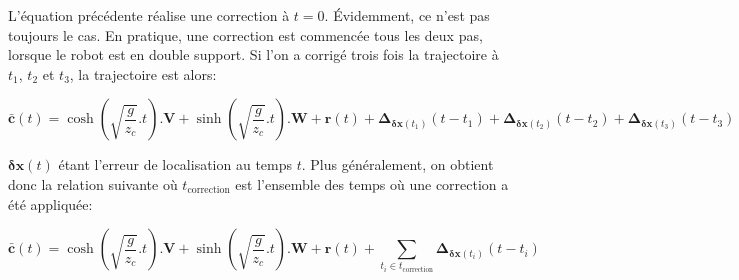 L'équation précédente réalise une correction à $t=0$. Évidemment, ce
n'est pas toujours le cas. En pratique, une correction est commencée
tous les deux pas, lorsque le robot est en double support. Si l'on a
corrigé trois fois la trajectoire à $t_1$, $t_2$ et $t_3$, la
trajectoire est alors:

\begin{equation} \label{eq:zmpsolcor2}
  \bar{\mathbf{c}}(t) = \cosh(\sqrt{\frac{g}{z_c}}.t) . \mathbf{V} +
  \sinh(\sqrt{\frac{g}{z_c}}.t) . \mathbf{W} + \mathbf{r}(t) +
  \mathbf{\Delta}_{\mathbf{\delta {x}}(t_1)}(t-t_1) +
  \mathbf{\Delta}_{\mathbf{\delta {x}}(t_2)}(t-t_2) +
  \mathbf{\Delta}_{\mathbf{\delta {x}}(t_3)}(t-t_3)
\end{equation}

$\mathbf{\delta {x}}(t)$ étant l'erreur de localisation au temps
$t$. Plus généralement, on obtient donc la relation suivante où
$t_{\text{correction}}$ est l'ensemble des temps où une correction a
été appliquée:

\begin{equation} \label{eq:zmpsolcor3}
  \bar{\mathbf{c}}(t) = \cosh(\sqrt{\frac{g}{z_c}}.t) . \mathbf{V} +
  \sinh(\sqrt{\frac{g}{z_c}}.t) . \mathbf{W} + \mathbf{r}(t) +
  \sum_{t_i \in t_{\text{correction}}} \mathbf{\Delta}_{\mathbf{\delta {x}}(t_i)}(t-t_i)
\end{equation}

